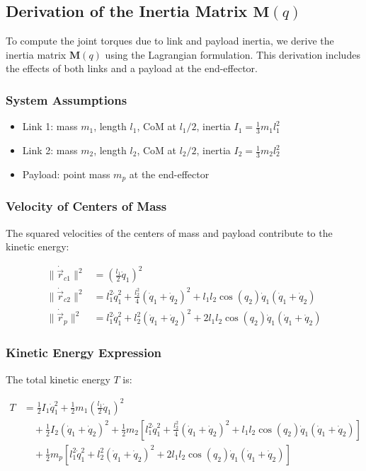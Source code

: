 \documentclass[a4paper,12pt]{article}
\begin{document}
\subsection*{Derivation of the Inertia Matrix $\mathbf{M}(q)$}

To compute the joint torques due to link and payload inertia, we derive the inertia matrix $\mathbf{M}(q)$ using the Lagrangian formulation. This derivation includes the effects of both links and a payload at the end-effector.

\subsubsection*{System Assumptions}

\begin{itemize}
    \item Link 1: mass $m_1$, length $l_1$, CoM at $l_1/2$, inertia $I_1 = \frac{1}{3} m_1 l_1^2$
    \item Link 2: mass $m_2$, length $l_2$, CoM at $l_2/2$, inertia $I_2 = \frac{1}{3} m_2 l_2^2$
    \item Payload: point mass $m_p$ at the end-effector
\end{itemize}

\subsubsection*{Velocity of Centers of Mass}

The squared velocities of the centers of mass and payload contribute to the kinetic energy:

\begin{align*}
\|\dot{\vec{r}}_{c1}\|^2 &= \left( \frac{l_1}{2} \dot{q}_1 \right)^2 \\
\|\dot{\vec{r}}_{c2}\|^2 &= l_1^2 \dot{q}_1^2 + \frac{l_2^2}{4} (\dot{q}_1 + \dot{q}_2)^2 + l_1 l_2 \cos(q_2) \dot{q}_1 (\dot{q}_1 + \dot{q}_2) \\
\|\dot{\vec{r}}_p\|^2 &= l_1^2 \dot{q}_1^2 + l_2^2 (\dot{q}_1 + \dot{q}_2)^2 + 2 l_1 l_2 \cos(q_2) \dot{q}_1 (\dot{q}_1 + \dot{q}_2)
\end{align*}

\subsubsection*{Kinetic Energy Expression}

The total kinetic energy $T$ is:

\begin{align*}
T &= \frac{1}{2} I_1 \dot{q}_1^2 
+ \frac{1}{2} m_1 \left( \frac{l_1}{2} \dot{q}_1 \right)^2 \\
&\quad + \frac{1}{2} I_2 (\dot{q}_1 + \dot{q}_2)^2
+ \frac{1}{2} m_2 \left[ l_1^2 \dot{q}_1^2 + \frac{l_2^2}{4} (\dot{q}_1 + \dot{q}_2)^2 + l_1 l_2 \cos(q_2) \dot{q}_1 (\dot{q}_1 + \dot{q}_2) \right] \\
&\quad + \frac{1}{2} m_p \left[ l_1^2 \dot{q}_1^2 + l_2^2 (\dot{q}_1 + \dot{q}_2)^2 + 2 l_1 l_2 \cos(q_2) \dot{q}_1 (\dot{q}_1 + \dot{q}_2) \right]
\end{align*}
\end{document}
